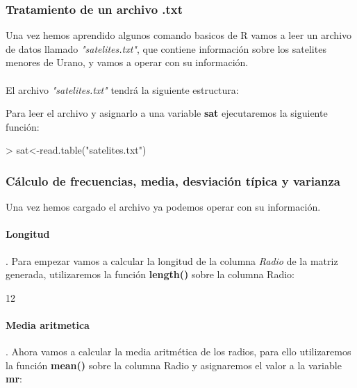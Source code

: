 \documentclass [a4paper] {article}
\begin{document}
\subsubsection{Tratamiento de un archivo .txt}
Una vez hemos aprendido algunos comando basicos de R vamos a leer un archivo de datos
llamado \textit{"satelites.txt"}, que contiene información sobre los satelites menores 
de Urano, y vamos a operar con su información.\\\\

El archivo \textit{"satelites.txt"} tendrá la siguiente estructura:\\

\begingroup
\setlength{\parindent}{20ex}
\obeylines
%
\par
\endgroup%

Para leer el archivo y asignarlo a una variable \textbf{sat} ejecutaremos la siguiente
función:

\begin{Schunk}
\begin{Sinput}
> sat<-read.table("satelites.txt")
\end{Sinput}
\end{Schunk}
\subsubsection{Cálculo de frecuencias, media, desviación típica y varianza}

Una vez hemos cargado el archivo ya podemos operar con su información.\\
\paragraph{Longitud}. Para empezar vamos a calcular la longitud de la columna \textit{Radio} de la matriz generada, 
utilizaremos la
función \textbf{length()} sobre la columna Radio:

\begin{Schunk}
\begin{Soutput}
[1] 12
\end{Soutput}
\end{Schunk}
\paragraph{Media aritmetica}. Ahora vamos a calcular la media aritmética de los radios, para ello utilizaremos la
función \textbf{mean()} sobre la columna Radio y asignaremos el valor a la variable
\textbf{mr}:
\end{document}
